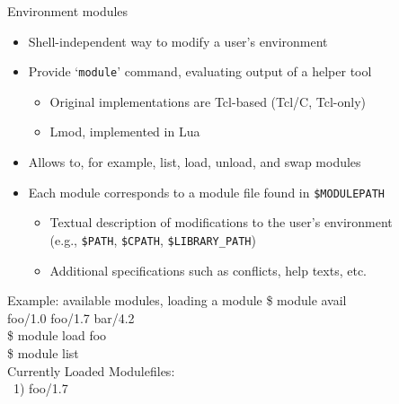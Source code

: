 \documentclass[10pt,xcolor={usenames,dvipsnames}]{beamer}
\begin{document}
\begin{frame}{Environment modules}
\begin{itemize}
    \item
        Shell-independent way to modify a user's environment
    \item
        Provide `\texttt{module}' command, evaluating output of a helper tool
        \begin{itemize}
            \item
                Original implementations are Tcl-based (Tcl/C, Tcl-only)
            \item
                Lmod, implemented in Lua
        \end{itemize}
    \item
        Allows to, for example, list, load, unload, and swap modules
    \item
        Each module corresponds to a module file found in \texttt{\$MODULEPATH}
        \begin{itemize}
            \item
                Textual description of modifications to the user's environment\\
                (e.g., \texttt{\$PATH}, \texttt{\$CPATH},
                \texttt{\$LIBRARY\_PATH})
            \item
                Additional specifications such as conflicts, help texts, etc.
        \end{itemize}
\end{itemize}
\vspace*{-10pt}
\begin{center}
    \begin{minipage}{0.9\textwidth}
        \begin{exampleblock}{\footnotesize Example: available modules, loading a module}
            \scriptsize
            \ttfamily
            \$ module avail\\
            foo/1.0 \quad foo/1.7 \quad bar/4.2\\
            \$ module load foo\\
            \$ module list\\
            Currently Loaded Modulefiles:\\
            ~1) foo/1.7
        \end{exampleblock}
    \end{minipage}
\end{center}
\end{frame}
\end{document}
